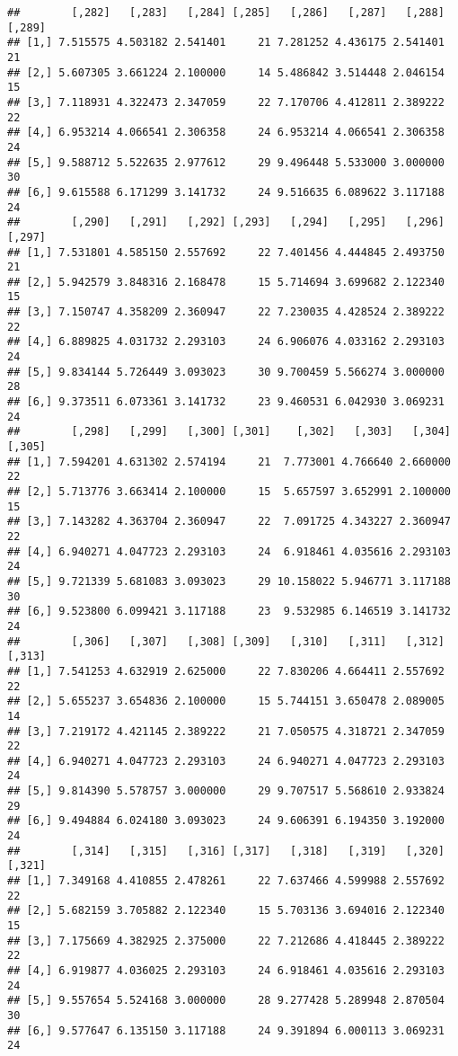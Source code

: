 \documentclass[]{article}
\begin{document}
\begin{verbatim}
##        [,282]   [,283]   [,284] [,285]   [,286]   [,287]   [,288] [,289]
## [1,] 7.515575 4.503182 2.541401     21 7.281252 4.436175 2.541401     21
## [2,] 5.607305 3.661224 2.100000     14 5.486842 3.514448 2.046154     15
## [3,] 7.118931 4.322473 2.347059     22 7.170706 4.412811 2.389222     22
## [4,] 6.953214 4.066541 2.306358     24 6.953214 4.066541 2.306358     24
## [5,] 9.588712 5.522635 2.977612     29 9.496448 5.533000 3.000000     30
## [6,] 9.615588 6.171299 3.141732     24 9.516635 6.089622 3.117188     24
##        [,290]   [,291]   [,292] [,293]   [,294]   [,295]   [,296] [,297]
## [1,] 7.531801 4.585150 2.557692     22 7.401456 4.444845 2.493750     21
## [2,] 5.942579 3.848316 2.168478     15 5.714694 3.699682 2.122340     15
## [3,] 7.150747 4.358209 2.360947     22 7.230035 4.428524 2.389222     22
## [4,] 6.889825 4.031732 2.293103     24 6.906076 4.033162 2.293103     24
## [5,] 9.834144 5.726449 3.093023     30 9.700459 5.566274 3.000000     28
## [6,] 9.373511 6.073361 3.141732     23 9.460531 6.042930 3.069231     24
##        [,298]   [,299]   [,300] [,301]    [,302]   [,303]   [,304] [,305]
## [1,] 7.594201 4.631302 2.574194     21  7.773001 4.766640 2.660000     22
## [2,] 5.713776 3.663414 2.100000     15  5.657597 3.652991 2.100000     15
## [3,] 7.143282 4.363704 2.360947     22  7.091725 4.343227 2.360947     22
## [4,] 6.940271 4.047723 2.293103     24  6.918461 4.035616 2.293103     24
## [5,] 9.721339 5.681083 3.093023     29 10.158022 5.946771 3.117188     30
## [6,] 9.523800 6.099421 3.117188     23  9.532985 6.146519 3.141732     24
##        [,306]   [,307]   [,308] [,309]   [,310]   [,311]   [,312] [,313]
## [1,] 7.541253 4.632919 2.625000     22 7.830206 4.664411 2.557692     22
## [2,] 5.655237 3.654836 2.100000     15 5.744151 3.650478 2.089005     14
## [3,] 7.219172 4.421145 2.389222     21 7.050575 4.318721 2.347059     22
## [4,] 6.940271 4.047723 2.293103     24 6.940271 4.047723 2.293103     24
## [5,] 9.814390 5.578757 3.000000     29 9.707517 5.568610 2.933824     29
## [6,] 9.494884 6.024180 3.093023     24 9.606391 6.194350 3.192000     24
##        [,314]   [,315]   [,316] [,317]   [,318]   [,319]   [,320] [,321]
## [1,] 7.349168 4.410855 2.478261     22 7.637466 4.599988 2.557692     22
## [2,] 5.682159 3.705882 2.122340     15 5.703136 3.694016 2.122340     15
## [3,] 7.175669 4.382925 2.375000     22 7.212686 4.418445 2.389222     22
## [4,] 6.919877 4.036025 2.293103     24 6.918461 4.035616 2.293103     24
## [5,] 9.557654 5.524168 3.000000     28 9.277428 5.289948 2.870504     30
## [6,] 9.577647 6.135150 3.117188     24 9.391894 6.000113 3.069231     24

\end{verbatim}
\end{document}
